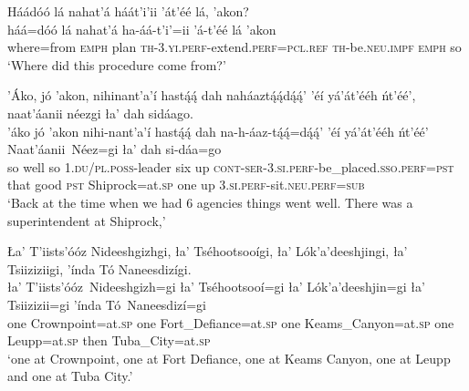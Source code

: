 \ea\label{ex:text7-3-7}
Háádóó lá nahat’á háát’i’ii ’át’éé lá, ’akon?\\
\gll háá=dóó	lá	nahat’á	ha-áá-t’i’=ii	’á-t’éé	lá	’akon\\
     where=from	\textsc{emph}	plan	\textsc{th}-3.\textsc{yi}.\textsc{perf}-extend.\textsc{perf}=\textsc{pcl}.\textsc{ref}	\textsc{th}-be.\textsc{neu}.\textsc{impf}	\textsc{emph}	so\\
\glt `Where did this procedure come from?'
\z

\ea\label{ex:text7-4-1}
’Áko, jó ’akon, nihinant’a’í hastą́ą́ dah naháaztą́ą́dą́ą́’ ’éí yá’át’ééh ńt’éé’, naat’áanii néezgi ła’ dah sidáago.\\
\gll ’áko	jó	’akon	nihi-nant’a’í	hastą́ą́	dah	na-h-áaz-tą́ą́=dą́ą́’	’éí	yá’át’ééh	ńt’éé’	Naat’áanii~{Néez=gi}	ła’	dah	si-dáa=go\\
     so	well	so	1.\textsc{du}/\textsc{pl}.\textsc{poss}-leader	six	up	\textsc{cont}-\textsc{ser}-3.\textsc{si}.\textsc{perf}-be\_placed.\textsc{sso}.\textsc{perf}=\textsc{pst}	that	good	\textsc{pst}	Shiprock=at.\textsc{sp}	one	up	3.\textsc{si}.\textsc{perf}-sit.\textsc{neu}.\textsc{perf}=\textsc{sub}\\
\glt `Back at the time when we had 6 agencies things went well. There was a superintendent at Shiprock,'
\z

\ea\label{ex:text7-4-2}
Ła’ T’iists’óóz Nideeshgizhgi, ła’ Tséhootsooígi, ła’ Lók’a’deeshjingi, ła’ Tsiiziziigi, ’índa Tó Naneesdizígi.\\
\gll ła’	T’iists’óóz~{Nideeshgizh=gi}	ła’	Tséhootsooí=gi	ła’	Lók’a’deeshjin=gi	ła’	Tsiizizii=gi	’índa	Tó~{Naneesdizí=gi}\\
     one	Crownpoint=at.\textsc{sp}	one	Fort\_Defiance=at.\textsc{sp}	one	Keams\_Canyon=at.\textsc{sp}	one	Leupp=at.\textsc{sp}	then	Tuba\_City=at.\textsc{sp}\\
\glt `one at Crownpoint, one at Fort Defiance, one at Keams Canyon, one at Leupp and one at Tuba City.'
\z

